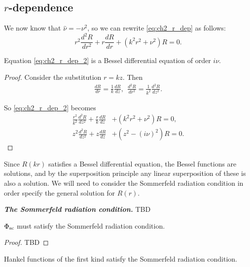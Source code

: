 \subsection{\texorpdfstring{$r$}{r}-dependence}
We now know that $\hat{\nu} = - \nu^2$, so we can rewrite \eqref{eq:ch2_r_dep} as follows:
    \begin{equation}\label{eq:ch2_r_dep_2}
        r^2 \frac{d^2 R}{dr^2} + r \frac{d R}{dr} + (k^2r^2 + \nu^2) R = 0.
    \end{equation}
    \begin{propn}
    Equation \eqref{eq:ch2_r_dep_2} is a Bessel differential equation of order $i\nu$.
    \end{propn}
    \begin{proof} Consider the substitution $r=kz$. Then
        \begin{align*}
            \frac{dR}{dr} = \frac{1}{k} \frac{dR}{dz}, ~~
            \frac{d^2R}{dr^2} = \frac{1}{k^2} \frac{d^2R}{dz^2}.
        \end{align*}\par
    So \eqref{eq:ch2_r_dep_2} becomes
        \begin{align}
            \frac{r^2}{k^2}\frac{d^2R}{dz^2}
                + \frac{r}{k}\frac{dR}{dz}
                &+ (k^2r^2 + \nu^2)R = 0, \\
            z^2 \frac{d^2 R}{dz^2}
                + z \frac{dR}{dz}
                &+ (z^2 - (i\nu)^2)R = 0.
        \end{align}
    \end{proof}\par
%
Since $R(kr)$ satisfies a Bessel differential equation, the Bessel functions are solutions, and by the superposition principle any linear superposition of these is also a solution. We will need to consider the Sommerfeld radiation condition in order specify the general solution for $R(r)$. \par
%
  \begin{defn}\textbf{\emph{The Sommerfeld radiation condition.}} TBD
  \end{defn}
%
  \begin{propn}
      $\Phi_{\text{sc}}$ must satisfy the Sommerfeld radiation condition.
  \end{propn}
  \begin{proof} TBD
  \end{proof}
%
  \begin{propn}
      Hankel functions of the first kind satisfy the Sommerfeld radiation condition.
  \end{propn}
